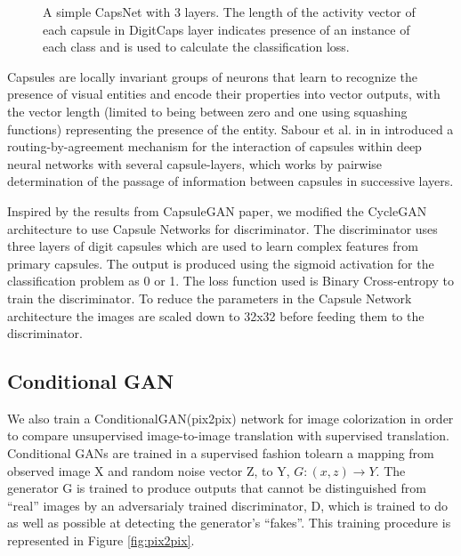 \documentclass{article} %
\begin{document}
\begin{figure}[h]
	\begin{center}
	\end{center}
	\caption{A simple CapsNet with 3 layers. The length of the activity vector of each capsule in DigitCaps layer indicates presence of an instance of each class and is used to calculate the classification loss.\cite{capsnet} }
\end{figure}

Capsules are locally invariant groups of neurons that learn to recognize the presence of visual entities and encode their properties into vector outputs, with the vector length (limited to being between zero and one using squashing functions) representing the presence of the entity. Sabour et al. in in \cite{capsnet} introduced a routing-by-agreement mechanism for the interaction of capsules within deep neural networks with several capsule-layers, which works by pairwise determination of the passage of information between capsules in successive layers. 


Inspired by the results from CapsuleGAN paper\cite{capsuleGan}, we modified the CycleGAN architecture to use Capsule Networks for discriminator. The discriminator uses three layers of digit capsules which are used to learn complex features from primary capsules. The output is produced using the sigmoid activation for the classification problem as 0 or 1. The loss function used is Binary Cross-entropy to train the discriminator. To reduce the parameters in the Capsule Network architecture the images are scaled down to 32x32 before feeding them to the discriminator. 

\subsection{Conditional GAN}

We also train a ConditionalGAN(pix2pix)\cite{pix2pix} network for image colorization in order to compare unsupervised image-to-image translation with supervised translation. Conditional GANs are trained in a supervised fashion tolearn a mapping from observed image X and random noise vector Z, to Y,  $G :(x,z) \rightarrow Y$. The generator G is trained to produce outputs that cannot be distinguished from “real” images by an adversarialy trained discriminator, D, which is trained to do as well as possible at detecting the generator’s “fakes”. This training procedure is represented in Figure \ref{fig:pix2pix}.
\end{document}
